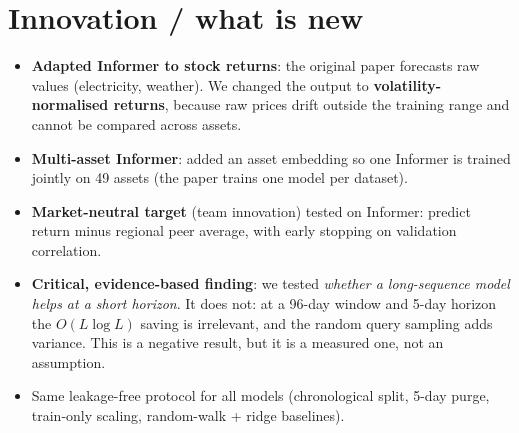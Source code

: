 \documentclass[10pt,a4paper]{article}
\begin{document}
\section{Innovation / what is new}
\begin{itemize}
  \item \textbf{Adapted Informer to stock returns}: the original paper forecasts raw values (electricity, weather). We changed the output to \textbf{volatility-normalised returns}, because raw prices drift outside the training range and cannot be compared across assets.
  \item \textbf{Multi-asset Informer}: added an asset embedding so one Informer is trained jointly on 49 assets (the paper trains one model per dataset).
  \item \textbf{Market-neutral target} (team innovation) tested on Informer: predict return minus regional peer average, with early stopping on validation correlation.
  \item \textbf{Critical, evidence-based finding}: we tested \emph{whether a long-sequence model helps at a short horizon}. It does not: at a 96-day window and 5-day horizon the $O(L\log L)$ saving is irrelevant, and the random query sampling adds variance. This is a negative result, but it is a measured one, not an assumption.
  \item Same leakage-free protocol for all models (chronological split, 5-day purge, train-only scaling, random-walk + ridge baselines).
\end{itemize}
\end{document}
